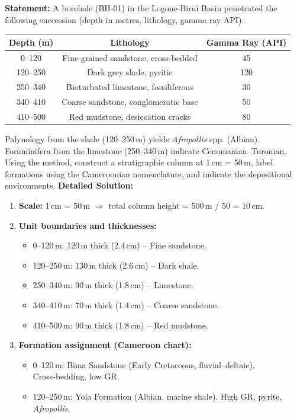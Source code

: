 \documentclass[11pt]{article}
\newcommand{\cle}[1]{{\popxbold\color{popdark}#1}}
\begin{document}
\begin{exoresolu}
\textbf{Statement:} A borehole (BH‑01) in the Logone‑Birni Basin penetrated the following succession (depth in metres, lithology, gamma ray API):
\begin{center}
\begin{tabular}{|c|c|c|}\hline
Depth (m) & Lithology & Gamma Ray (API)\\\hline
0–120 & Fine‑grained sandstone, cross‑bedded & 45\\\hline
120–250 & Dark grey shale, pyritic & 120\\\hline
250–340 & Bioturbated limestone, fossiliferous & 30\\\hline
340–410 & Coarse sandstone, conglomeratic base & 50\\\hline
410–500 & Red mudstone, desiccation cracks & 80\\\hline
\end{tabular}
\end{center}
Palynology from the shale (120–250\,m) yields \emph{Afropollis} spp. (Albian). Foraminifera from the limestone (250–340\,m) indicate Cenomanian–Turonian. Using the method, construct a stratigraphic column at 1\,cm = 50\,m, label formations using the Cameroonian nomenclature, and indicate the depositional environments.
\tcblower
\textbf{Detailed Solution:}
\begin{enumerate}
\item \textbf{Scale:} 1\,cm = 50\,m $\Rightarrow$ total column height = 500\,m / 50 = 10\,cm.
\item \textbf{Unit boundaries and thicknesses:}
\begin{itemize}
\item 0–120\,m: 120\,m thick (2.4\,cm) – Fine sandstone.
\item 120–250\,m: 130\,m thick (2.6\,cm) – Dark shale.
\item 250–340\,m: 90\,m thick (1.8\,cm) – Limestone.
\item 340–410\,m: 70\,m thick (1.4\,cm) – Coarse sandstone.
\item 410–500\,m: 90\,m thick (1.8\,cm) – Red mudstone.
\end{itemize}
\item \textbf{Formation assignment (Cameroon chart):}
\begin{itemize}
\item 0–120\,m: \cle{Bima Sandstone} (Early Cretaceous, fluvial–deltaic). Cross‑bedding, low GR.
\item 120–250\,m: \cle{Yola Formation} (Albian, marine shale). High GR, pyrite, \emph{Afropollis}.

\end{itemize}
\end{enumerate}
\end{exoresolu}
\end{document}
